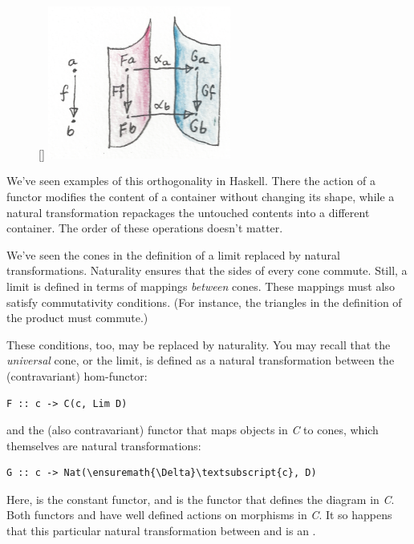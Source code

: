 \begin{figure}
\raisebox{0pt}[\dimexpr{}\baselineskip\relax]{
\includegraphics[width=60mm]{images/sheets.png}}%
\end{figure}

\noindent
We've seen examples of this orthogonality in Haskell. There the action
of a functor modifies the content of a container without changing its
shape, while a natural transformation repackages the untouched contents
into a different container. The order of these operations doesn't
matter.

We've seen the cones in the definition of a limit replaced by natural
transformations. Naturality ensures that the sides of every cone
commute. Still, a limit is defined in terms of mappings \emph{between}
cones. These mappings must also satisfy commutativity conditions. (For
instance, the triangles in the definition of the product must commute.)

These conditions, too, may be replaced by naturality. You may recall
that the \emph{universal} cone, or the limit, is defined as a natural
transformation between the (contravariant) hom-functor:

\begin{Verbatim}[commandchars=\\\{\}]
F :: c -> C(c, Lim D)
\end{Verbatim}
and the (also contravariant) functor that maps objects in \emph{C} to
cones, which themselves are natural transformations:

\begin{Verbatim}[commandchars=\\\{\}]
G :: c -> Nat(\ensuremath{\Delta}\textsubscript{c}, D)
\end{Verbatim}
Here,  is the constant functor, and  is the functor
that defines the diagram in \emph{C}. Both functors  and
 have well defined actions on morphisms in \emph{C}. It so
happens that this particular natural transformation between 
and  is an .

